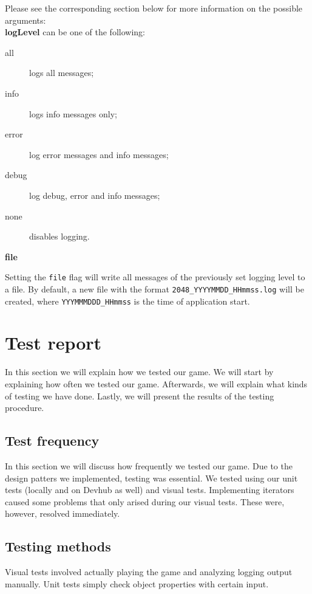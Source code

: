 \documentclass[a4paper,11pt,report]{scrartcl}
\begin{document}
Please see the corresponding section below for more information on the possible
arguments:\\

\textbf{logLevel} can be one of the following:
\begin{description}
	\item[all] logs all messages;
	\item[info] logs info messages only;
	\item[error] log error messages and info messages;
	\item[debug] log debug, error and info messages;
	\item[none] disables logging.
\end{description}

\textbf{file}

Setting the \texttt{file} flag will write all messages of the previously set
logging level to a file. By default, a new file with the format
\texttt{2048\_YYYYMMDD\_HHmmss.log} will be created, where
\texttt{YYYMMMDDD\_HHmmss} is the time of application start.

\newpage\section{Test report}

In this section we will explain how we tested our game. We will start by
explaining how often we tested our game. Afterwards, we will explain what
kinds of testing we have done. Lastly, we will present the results of the
testing procedure.

\subsection{Test frequency}
In this section we will discuss how frequently we tested our game. Due to the
design patters we implemented, testing was essential. We tested using our
unit tests (locally and on Devhub as well) and visual tests. Implementing
iterators caused some problems that only arised during our visual tests. These
were, however, resolved immediately.

\subsection{Testing methods}
Visual tests involved actually playing the game and analyzing logging output
manually. Unit tests simply check object properties with certain input.
\end{document}
